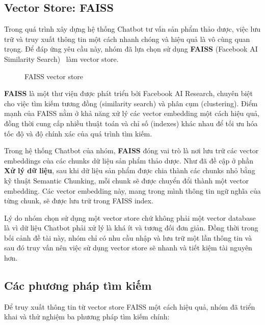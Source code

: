\documentclass{article}
\numberwithin{equation}{section}
\numberwithin{equation}{section}
\begin{document}
\subsection{Vector Store: FAISS}
Trong quá trình xây dựng hệ thống Chatbot tư vấn sản phẩm thảo dược, việc lưu trữ và truy xuất thông tin một cách nhanh chóng và hiệu quả là vô cùng quan trọng. Để đáp ứng yêu cầu này, nhóm đã lựa chọn sử dụng \textbf{FAISS} (Facebook AI Similarity Search)~\cite{douze2024faisslibrary} làm vector store.
\begin{figure}[!ht]
    \centering
    \caption{FAISS vector store}
    \label{fig:faiss-vectorstore}
\end{figure}
\textbf{FAISS} là một thư viện được phát triển bởi Facebook AI Research, chuyên biệt cho việc tìm kiếm tương đồng (similarity search) và phân cụm (clustering). Điểm mạnh của FAISS nằm ở khả năng xử lý các vector embedding một cách hiệu quả, đồng thời cung cấp nhiều thuật toán và chỉ số (indexes) khác nhau để tối ưu hóa tốc độ và độ chính xác của quá trình tìm kiếm.

Trong hệ thống Chatbot của nhóm, \textbf{FAISS} đóng vai trò là nơi lưu trữ các vector embeddings của các chunks dữ liệu sản phẩm thảo dược.  Như đã đề cập ở phần \textbf{Xử lý dữ liệu}, sau khi dữ liệu sản phẩm được chia thành các chunks nhỏ bằng kỹ thuật Semantic Chunking, mỗi chunk sẽ được chuyển đổi thành một vector embedding. Các vector embedding này, mang trong mình thông tin ngữ nghĩa của từng chunk, sẽ được lưu trữ trong FAISS index.

Lý do nhóm chọn sử dụng một vector store chứ không phải một vector database là vì dữ liệu Chatbot phải xử lý là khá ít và tương đối đơn giản. Đồng thời trong bối cảnh đề tài này, nhóm chỉ có nhu cầu nhập và lưu trữ một lần thông tin và sau đó truy vấn nên việc sử dụng vector store sẽ nhanh và tiết kiệm tài nguyên hơn.
\subsection{Các phương pháp tìm kiếm}
Để truy xuất thông tin từ vector store FAISS một cách hiệu quả, nhóm đã triển khai và thử nghiệm ba phương pháp tìm kiếm chính:
\end{document}
